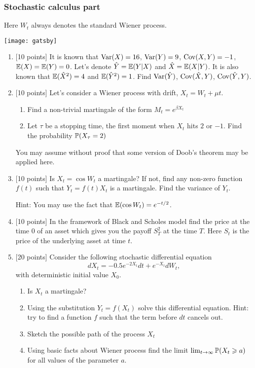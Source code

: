 \documentclass[12pt, a4paper]{article}
\begin{document}
\subsubsection*{Stochastic calculus part}

Here $W_t$ always denotes the standard Wiener process.

\vspace{10pt}

\begin{center}
\texttt{[image: gatsby]}
\end{center}

\vspace{10pt}


\begin{enumerate}
\item $[$10 points] It is known that $\Var(X)=16$, $\Var(Y)=9$, $\Cov(X,Y)=-1$, $\E(X)=\E(Y)=0$. Let's denote $\hat{Y}=\E(Y|X)$ and $\hat{X}=\E(X|Y)$. It is also known that $\E(\hat{X}^2)=4$ and $\E(\hat{Y}^2)=1$.  Find $\Var(\hat{Y})$, $\Cov(\hat{X},Y)$, $\Cov(\hat{Y},Y)$.
\item $[$10 points] Let's consider a Wiener process with drift, $X_t=W_t+\mu t$.
\begin{enumerate}
\item Find a non-trivial martingale of the form $M_t=e^{\beta X_t}$
\item Let $\tau$ be a stopping time, the first moment when $X_t$ hits $2$ or $-1$. Find the probability $\P(X_\tau=2)$
\end{enumerate}
You may assume without proof that some version of Doob's theorem may be applied here.
\item $[$10 points] Is $X_t=\cos W_t$ a martingale? If not, find any non-zero function $f(t)$ such that $Y_t=f(t)X_t$ is a martingale. Find the variance of $Y_t$.

Hint: You may use the fact that $\E(\cos W_t)=e^{-t/2}$.

\item $[$10 points] In the framework of Black and Scholes model find the price at the time $0$ of an asset which gives you the payoff $S_T^2$ at the time $T$. Here $S_t$ is the price of the underlying asset at time $t$.
\item $[$20 points] Consider the following stochastic differential equation
\[
dX_t=-0.5e^{-2X_t}dt+e^{-X_t}dW_t,
\]
with deterministic initial value $X_0$.
\begin{enumerate}
\item Is $X_t$ a martingale?
\item Using the substitution $Y_t=f(X_t)$ solve this differential equation. Hint: try to find a function $f$ such that the term before $dt$ cancels out.
\item Sketch the possible path of the process $X_t$
\item Using basic facts about Wiener process find the limit $\lim_{t\to\infty} \P(X_t \geq a)$ for all values of the parameter $a$.
\end{enumerate}

\end{enumerate}
\end{document}
